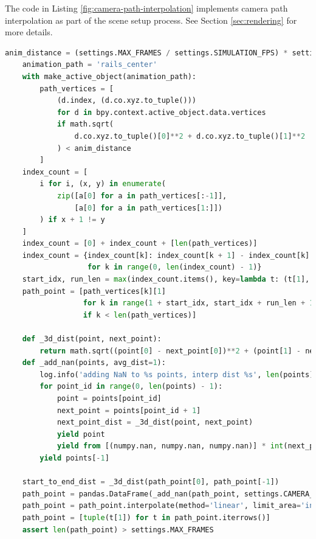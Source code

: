 The code in Listing \ref{fig:camera-path-interpolation} implements camera path interpolation as part of the scene setup process. See Section \ref{sec:rendering} for more details.

\begin{lstlisting}[language=python,caption={Camera Path Interpolation},label={fig:camera-path-interpolation}]
    anim_distance = (settings.MAX_FRAMES / settings.SIMULATION_FPS) * settings.CAMERA_ANIMATION_SPEED_M_S * 2 + 500
    animation_path = 'rails_center'
    with make_active_object(animation_path):
        path_vertices = [
            (d.index, (d.co.xyz.to_tuple()))
            for d in bpy.context.active_object.data.vertices
            if math.sqrt(
                d.co.xyz.to_tuple()[0]**2 + d.co.xyz.to_tuple()[1]**2
            ) < anim_distance
        ]
    index_count = [
        i for i, (x, y) in enumerate(
            zip([a[0] for a in path_vertices[:-1]],
                [a[0] for a in path_vertices[1:]])
        ) if x + 1 != y
    ]
    index_count = [0] + index_count + [len(path_vertices)]
    index_count = {index_count[k]: index_count[k + 1] - index_count[k]
                   for k in range(0, len(index_count) - 1)}
    start_idx, run_len = max(index_count.items(), key=lambda t: (t[1], random.random()))
    path_point = [path_vertices[k][1]
                  for k in range(1 + start_idx, start_idx + run_len + 1)
                  if k < len(path_vertices)]

    def _3d_dist(point, next_point):
        return math.sqrt((point[0] - next_point[0])**2 + (point[1] - next_point[1])**2 + (point[2] - next_point[2])**2)
    def _add_nan(points, avg_dist=1):
        log.info('adding NaN to %s points, interp dist %s', len(points), avg_dist)
        for point_id in range(0, len(points) - 1):
            point = points[point_id]
            next_point = points[point_id + 1]
            next_point_dist = _3d_dist(point, next_point)
            yield point
            yield from [(numpy.nan, numpy.nan, numpy.nan)] * int(next_point_dist / avg_dist)
        yield points[-1]

    start_to_end_dist = _3d_dist(path_point[0], path_point[-1])
    path_point = pandas.DataFrame(_add_nan(path_point, settings.CAMERA_ANIMATION_SPEED_M_S / settings.SIMULATION_FPS))
    path_point = path_point.interpolate(method='linear', limit_area='inside')
    path_point = [tuple(t[1]) for t in path_point.iterrows()]
    assert len(path_point) > settings.MAX_FRAMES
\end{lstlisting}

